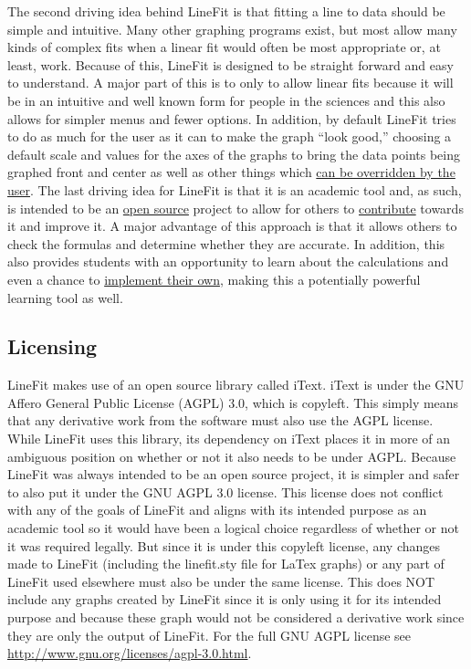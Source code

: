 \documentclass[titlepage,12pt]{article}
\begin{document}
The second driving idea behind LineFit is that fitting a line to data should be simple and intuitive. Many other graphing programs exist, but most allow many kinds of complex fits when a linear fit would often be most appropriate or, at least, work. Because of this, LineFit is designed to be straight forward and easy to understand. A major part of this is to only to allow linear fits because it will be in an intuitive and well known form for people in the sciences and this also allows for simpler menus and fewer options. In addition, by default LineFit tries to do as much for the user as it can to make the graph “look good,” choosing a default scale and values for the axes of the graphs to bring the data points being graphed front and center as well as other things which \hyperref[sec:options]{can be overridden by the user}.
The last driving idea for LineFit is that it is an academic tool and, as such, is intended to be an \hyperref[sec:licensing]{open source} project to allow for others to \hyperref[sec:contribute]{contribute} towards it and improve it. A major advantage of this approach is that it allows others to check the formulas and determine whether they are accurate. In addition, this also provides students with an opportunity to learn about the calculations and even a chance to \hyperref[sec:contribute]{implement their own}, making this a potentially powerful learning tool as well.



\subsection{Licensing}
\label{sec:licensing}

LineFit makes use of an open source library called iText. iText is under the GNU Affero General Public License (AGPL) 3.0, which is copyleft. This simply means that any derivative work from the software must also use the AGPL license. While LineFit uses this library, its dependency on iText places it in more of an ambiguous position on whether or not it also needs to be under AGPL. Because LineFit was always intended to be an open source project, it is simpler and safer to also put it under the GNU AGPL 3.0 license. This license does not conflict with any of the goals of LineFit and aligns with its intended purpose as an academic tool so it would have been a logical choice regardless of whether or not it was required legally. But since it is under this copyleft license, any changes made to LineFit (including the linefit.sty file for LaTex graphs) or any part of LineFit used elsewhere must also be under the same license. This does NOT include any graphs created by LineFit since it is only using it for its intended purpose and because these graph would not be considered a derivative work since they are only the output of LineFit. For the full GNU AGPL license see \url{http://www.gnu.org/licenses/agpl-3.0.html}.
\end{document}

